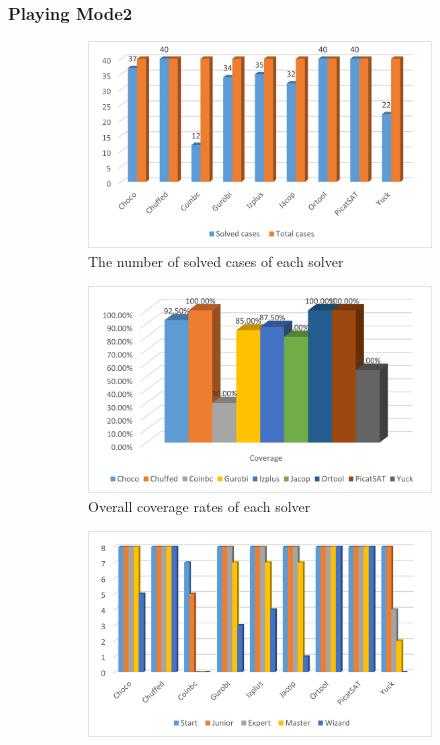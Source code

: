 \subsubsection{Playing Mode2}
\begin{figure}[htbp]
    \centering
    \begin{subfigure}[b]{0.48\textwidth}
    \centering
    \includegraphics[width=\textwidth]{figs/mode2solvedcases.png}
    \caption{The number of solved cases of each solver}
    \label{fig:mode2eva1}
    \end{subfigure}
     \begin{subfigure}[b]{0.48\textwidth}
     \centering
    \includegraphics[width=\textwidth]{figs/mode2coverage.png}
    \caption{Overall coverage rates of each solver}
    \label{fig:mode2eva2}
    \end{subfigure}
     \begin{subfigure}[b]{0.48\textwidth}
    \includegraphics[width=\textwidth]{figs/mode2separatedcases.png}

\end{subfigure}
\end{figure}
